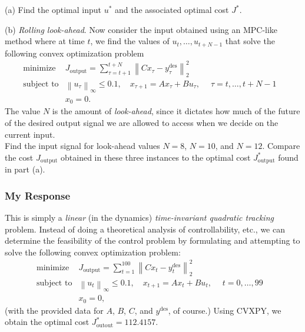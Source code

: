 \documentclass[12pt,reqno]{article}
\theoremstyle{definition}
\numberwithin{equation}{section}
\begin{document}
    \noindent (a) Find the optimal input $u^*$ and the associated optimal cost $J^*$.
    
    \vspace{0.1cm}

    \noindent (b) \textit{Rolling look-ahead}. Now consider the input obtained using an MPC-like method
    where at time $t$, we find the values of $u_t, \ldots, u_{t+N-1}$ that solve the following convex optimization
    problem
    \[\begin{array}{lll}
        \text{minimize} \; & J_{\text{output}} =  \sum_{\tau=t+1}^{t+N}\left\lVert Cx_\tau - y_\tau^{\text{des}} \right\rVert_{2}^2 & \\
        \text{subject to} & \left\lVert u_\tau \right\rVert_{\infty} \le 0.1, \quad x_{\tau+1} = Ax_\tau + Bu_\tau, \; \quad \tau = t, \ldots, t + N - 1 & \\
        &x_0 = 0.
        \end{array}\]
    The value $N$ is the amount of \textit{look-ahead}, since it dictates how much of the future of the desired
    output signal we are allowed to access when we decide on the current input.\\
    Find the input signal for look-ahead values $N=8$, $N=10$, and $N=12$. Compare the cost $J_{\text{output}}$
    obtained in these three instances to the optimal cost $J_{\text{output}}^{*}$ found in part (a).
    
\subsubsection*{My Response}
    
    This is simply a \textit{linear} (in the dynamics) \textit{time-invariant quadratic tracking} problem.
    Instead of doing a theoretical analysis of controllability, etc., we can determine the feasibility
    of the control problem by formulating and attempting to solve the following convex optimization problem:
    \[\begin{array}{lll}
    \text{minimize} \; & J_{\text{output}} = \sum_{t=1}^{100}\left\lVert Cx_t - y_t^{\text{des}} \right\rVert_{2}^2 & \\
    \text{subject to} & \left\lVert u_t \right\rVert_{\infty} \le 0.1, \quad x_{t+1} = Ax_t + Bu_t, \; \quad t = 0, \ldots, 99 & \\
    &x_0 = 0,
    \end{array}\]
    (with the provided data for $A$, $B$, $C$, and $y^{\text{des}}$, of course.) Using CVXPY, we obtain the optimal cost 
    $J_{\text{outout}}^{*} = 112.4157$.
    
\end{document}
